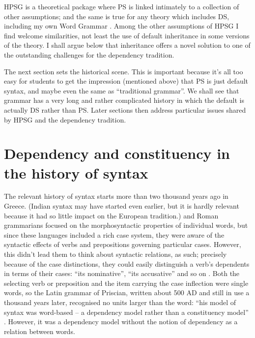 \documentclass[output=paper
 	        ,biblatex
                ,babelshorthands
                ,newtxmath
                ,draftmode
                ,colorlinks, citecolor=brown
]{langscibook}
\begin{document}
HPSG is a theoretical package where PS is linked intimately to a collection of other assumptions; and the same is true for any theory which includes DS, including my own Word Grammar
\citep{Hudson84a-u,Hudson90a-u,Hudson1998,Hudson2007a-u,Hudson2010b-u,Gisborne2010,GisborneTBA,Duran-Eppler2011,TraugottTrousdale2013}. Among the other assumptions of HPSG I find welcome similarities, not least the use of default inheritance in some versions of the theory. I shall argue below that inheritance offers a novel solution to one of the outstanding challenges for the dependency tradition.

The next section sets the historical scene. This is important because it’s all too easy for students to get the impression (mentioned above) that PS is just default syntax, and maybe even the same as ``traditional grammar''. We shall see that grammar has a very long and rather complicated history in which the default is actually DS rather than PS. Later sections then address particular issues shared by HPSG and the dependency tradition.


\section{Dependency and constituency in the history of syntax}
\label{sec:2}

The relevant history of syntax starts more than two thousand years ago in Greece. (Indian syntax may have started even earlier, but it is hardly relevant because it had so little impact on the European tradition.)  and Roman grammarians focused on the morphosyntactic properties of individual words, but since these languages included a rich case system, they were aware of the syntactic effects of verbs and prepositions governing particular cases. However, this didn’t lead them to think about syntactic relations, as such; precisely because of the case distinctions, they could easily distinguish a verb’s dependents in terms of their cases: ``its nominative'', ``its accusative'' and so on \citep[29]{Robins1967}. Both the selecting verb or preposition and the item carrying the case inflection were single words, so the Latin grammar of Priscian, written about 500 AD and still in use a thousand years later, recognised no units larger than the word: ``his model of syntax was word-based – a dependency model rather than a constituency model'' \citep[91]{Law2003}. However, it was a dependency model without the notion of dependency as a relation between words.
\end{document}
